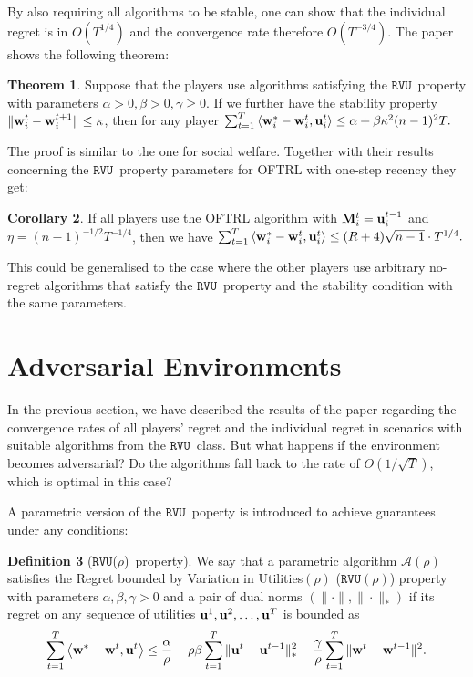\documentclass[a4paper]{article}
\theoremstyle{definition}
\newtheorem{theorem}{Theorem}
\newtheorem{defn}[theorem]{Definition}
\newtheorem{corollary}[theorem]{Corollary}
\newcommand{\myprop}{\ensuremath{\texttt{RVU}}}
\newcommand{\mst}{\ensuremath{w}}
\newcommand{\A}{\ensuremath{\mathcal{A}}}
\newcommand{\stable}{\ensuremath{\kappa}}
\newcommand{\knob}{\ensuremath{\rho}}
\renewcommand{\vec}[1]{\ensuremath{{\bf #1}}}
\newcommand{\dotp}[2]{\ensuremath{\left\langle #1, #2 \right\rangle}}
\begin{document}
By also requiring all algorithms to be stable, one can show that the
individual regret is in $O(T^{1/4})$ and the convergence rate
therefore $O(T^{-3/4})$.
The paper shows the following theorem:
\setcounter{theorem}{10}
\begin{theorem}\label{thm:sufficient-2}
Suppose that the players use algorithms satisfying the
\myprop~property with parameters $\alpha > 0, \beta > 0,\gamma \geq
0$. If we further have the stability property $\|\vec{\mst}_i^t -
\vec{\mst}_i^{t+1}\|\leq \stable$, then for any player
$\sum_{t=1}^{T} \dotp{\vec{\mst}_i^*-\vec{\mst}_i^t}{ \vec{u}_i^t}\leq
\alpha + \beta \stable^2 (n-1)^2 T.$
\end{theorem}

The proof is similar to the one for social welfare.
Together with their results concerning the \myprop~property parameters for OFTRL with one-step recency they get:

\begin{corollary}\label{cor:oftrl-bound}
If all players use the OFTRL algorithm with $\vec{M}_i^t =
\vec{u}_i^{t-1}$ and $\eta = (n-1)^{-1/2}T^{-1/4}$, then we have
$\sum_{t=1}^{T} \dotp{\vec{\mst}_i^*-\vec{\mst}_i^t}{ \vec{u}_i^t}\leq
(R+4)\sqrt{n-1}\cdot T^{1/4}.$
\end{corollary}

This could be generalised to the case where the other players use
arbitrary no-regret algorithms that satisfy the \myprop~property and
the stability condition with the same parameters.



\section{Adversarial Environments}
In the previous section, we have described the results of the paper
regarding the convergence rates of all players'
regret and the individual regret in
scenarios with suitable algorithms from the \myprop~class.
But what happens if the environment becomes adversarial?
Do the algorithms fall back to the rate of $O(1/\sqrt{T})$, which is optimal
in this case?

A parametric version of the \myprop~poperty is introduced to  achieve
guarantees under any conditions:

\begin{defn}[\myprop(\knob)~property]
  We say that a parametric algorithm $\A(\knob)$ satisfies the Regret
  bounded by Variation in Utilities$(\knob)$ ($\myprop(\knob)$)
  property with parameters $\alpha, \beta, \gamma > 0$ and a pair of
  dual norms $(\|\cdot\|, \|\cdot\|_*)$ if its regret on any sequence
  of utilities $\vec{u}^1, \vec{u}^2, \ldots, \vec{u}^T$ is bounded
  as \begin{equation*} \sum_{t=1}^{T} \dotp{\vec{w}^*- \vec{w}^t}{\vec{u}^t} \leq \frac{\alpha}{\knob}
  +\knob\beta \sum_{t=1}^{T} \| \vec{u}^t - \vec{u}^{t-1}\|_*^2
  - \frac{\gamma}{\knob}\sum_{t=1}^{T} \|\vec{w}^{t}
  - \vec{w}^{t-1}\|^2.  \label{eqn:reg-form-param} \end{equation*} \label{defn:alg-class-param}
\end{defn}
\end{document}
